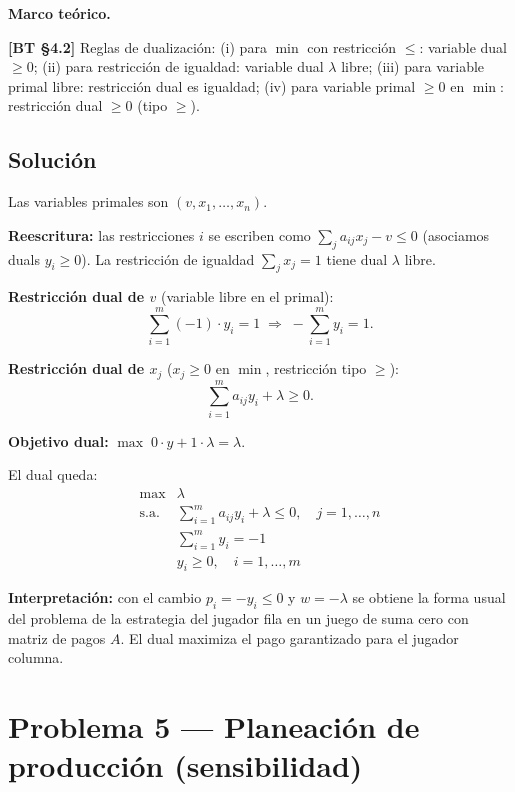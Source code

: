 \documentclass{article}
\newenvironment{marco}{\begin{mdframed}[linecolor=black!40,backgroundcolor=gray!5]\small\textbf{Marco teórico.}\par\smallskip}{\end{mdframed}\medskip}
\begin{document}
\begin{marco}
\textbf{[BT §4.2]} Reglas de dualización: (i) para $\min$ con restricción $\leq$: variable dual $\geq 0$; (ii) para restricción de igualdad: variable dual $\lambda$ libre; (iii) para variable primal libre: restricción dual es igualdad; (iv) para variable primal $\geq 0$ en $\min$: restricción dual $\geq 0$ (tipo $\geq$).
\end{marco}

\subsection*{Solución}

Las variables primales son $(v, x_1, \ldots, x_n)$.

\textbf{Reescritura:} las restricciones $i$ se escriben como $\sum_j a_{ij}x_j - v \leq 0$ (asociamos duals $y_i \geq 0$). La restricción de igualdad $\sum_j x_j = 1$ tiene dual $\lambda$ libre.

\textbf{Restricción dual de $v$} (variable libre en el primal):
\[
  \sum_{i=1}^{m}(-1)\cdot y_i = 1 \;\Rightarrow\; -\sum_{i=1}^m y_i = 1.
\]

\textbf{Restricción dual de $x_j$} ($x_j \geq 0$ en $\min$, restricción tipo $\geq$):
\[
  \sum_{i=1}^m a_{ij} y_i + \lambda \geq 0.
\]

\textbf{Objetivo dual:} $\max\; 0\cdot y + 1\cdot\lambda = \lambda$.

El dual queda:
\[
\begin{array}{ll}
\max & \lambda \\
\text{s.a.} & \sum_{i=1}^m a_{ij} y_i + \lambda \leq 0, \quad j=1,\ldots,n \\
& \sum_{i=1}^m y_i = -1 \\
& y_i \geq 0, \quad i=1,\ldots,m
\end{array}
\]

\textbf{Interpretación:} con el cambio $p_i = -y_i \leq 0$ y $w = -\lambda$ se obtiene la forma usual del problema de la estrategia del jugador fila en un juego de suma cero con matriz de pagos $A$. El dual maximiza el pago garantizado para el jugador columna.

\section*{Problema 5 --- Planeación de producción (sensibilidad)}
\end{document}
